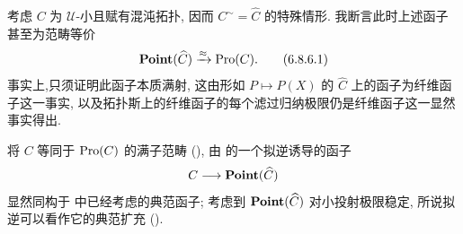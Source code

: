 \subsubsection{}
考虑 $C$ 为 $𝒰$-小且赋有混沌拓扑, 因而 $C^{\sim}=\widehat{C}$ 的特殊情形. 我断言此时上述函子甚至为范畴等价
\begin{equation*}
\operatorname{\mathbf{Point}}(\widehat{C})\xrightarrow{\approx}\operatorname{Pro}(C){}.\tag{6.8.6.1}
\end{equation*}
事实上,\pageoriginale 只须证明此函子本质满射, 这由形如 $P\mapsto P(X)$ 的 $\widehat{C}$ 上的函子为纤维函子这一事实, 以及拓扑斯上的纤维函子的每个滤过归纳极限仍是纤维函子这一显然事实得出.

将 $C$ 等同于 $\operatorname{Pro}(C)$ 的满子范畴 (), 由  的一个拟逆诱导的函子
$$
C\longrightarrow \operatorname{\mathbf{Point}}(\widehat{C})
$$
显然同构于  中已经考虑的典范函子; 考虑到 $\operatorname{\mathbf{Point}}(\widehat{C})$ 对小投射极限稳定, 所说拟逆可以看作它的典范扩充 ().

